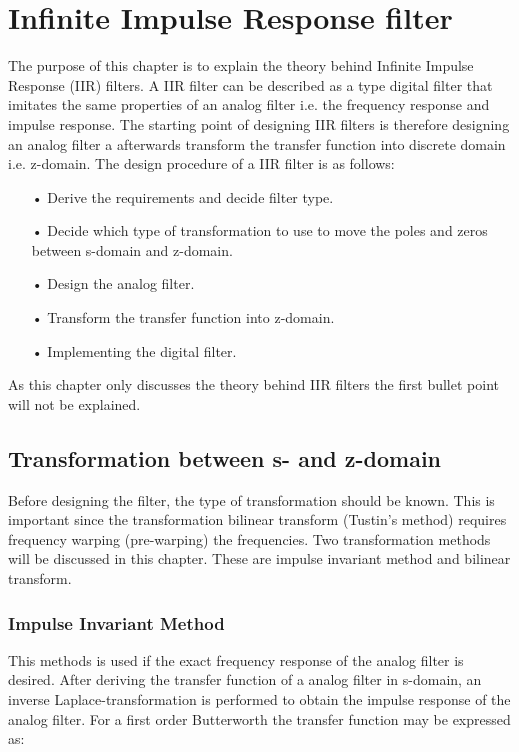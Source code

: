 \chapter{Infinite Impulse Response filter} \label{ch:IIR}

The purpose of this chapter is to explain the theory behind Infinite Impulse Response (IIR) filters. A IIR filter can be described as a type digital filter that imitates the same properties of an analog filter i.e. the frequency response and impulse response. The starting point of designing IIR filters is therefore designing an analog filter a afterwards transform the transfer function into discrete domain i.e. z-domain. The design procedure of a IIR filter is as follows:

\begin{itemize}
\item[•] Derive the requirements and decide filter type.
\item[•] Decide which type of transformation to use to move the poles and zeros between s-domain and z-domain.
\item[•] Design the analog filter.
\item[•] Transform the transfer function into z-domain.
\item[•] Implementing the digital filter.
\end{itemize}

As this chapter only discusses the theory behind IIR filters the first bullet point will not be explained.


\section{Transformation between s- and z-domain}

Before designing the filter, the type of transformation should be known. This is important since the transformation bilinear transform (Tustin's method) requires frequency warping (pre-warping) the frequencies. Two transformation methods will be discussed in this chapter. These are impulse invariant method and bilinear transform.

\subsection{Impulse Invariant Method}

This methods is used if the exact frequency response of the analog filter is desired. After deriving the transfer function of a analog filter in s-domain, an inverse Laplace-transformation is performed to obtain the impulse response of the analog filter. For a  first order Butterworth the transfer function may be expressed as:

